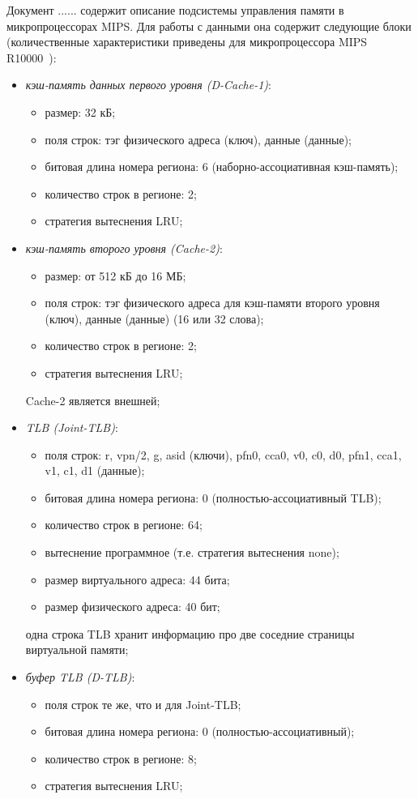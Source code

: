 \documentclass[14pt]{extreport}
\newcommand{\LRU}{\textsf{LRU}\xspace}
\begin{document}
Документ ...... содержит описание подсистемы управления памяти в
микропроцессорах
MIPS. Для работы с данными она содержит следующие блоки (количественные
характеристики приведены для микропроцессора MIPS R10000~\cite{R10000}):
\begin{itemize}
  \item \emph{кэш-память данных первого уровня (D-Cache-1)}:
        \begin{itemize}
            \item размер: 32 кБ;
            \item поля строк: тэг физического адреса (ключ), данные (данные);
            \item битовая длина номера региона: 6 (наборно-ассоциативная
кэш-память);
            \item количество строк в регионе: 2;
            \item стратегия вытеснения \LRU;
        \end{itemize}
  \item \emph{кэш-память второго уровня (Cache-2)}:
        \begin{itemize}
            \item размер: от 512 кБ до 16 МБ;
            \item поля строк: тэг физического адреса для кэш-памяти второго
уровня (ключ), данные (данные) (16 или 32 слова);
            \item количество строк в регионе: 2;
            \item стратегия вытеснения \LRU;
        \end{itemize}
         Cache-2 является внешней;
  \item \emph{TLB (Joint-TLB)}:
        \begin{itemize}
            \item поля строк: r, vpn/2, g, asid (ключи), pfn0, cca0, v0, c0, d0,
pfn1, cca1, v1, c1, d1 (данные);
            \item битовая длина номера региона: 0 (полностью-ассоциативный TLB);
            \item количество строк в регионе: 64;
            \item вытеснение программное (т.е. стратегия вытеснения none);
            \item размер виртуального адреса: 44 бита;
            \item размер физического адреса: 40 бит;
        \end{itemize}
        одна строка TLB хранит информацию про две соседние страницы виртуальной
        памяти;
  \item \emph{буфер TLB (D-TLB)}:
        \begin{itemize}
            \item поля строк те же, что и для Joint-TLB;
            \item битовая длина номера региона: 0 (полностью-ассоциативный);
            \item количество строк в регионе: 8;
            \item стратегия вытеснения \LRU;
        \end{itemize}
\end{itemize}
\end{document}
